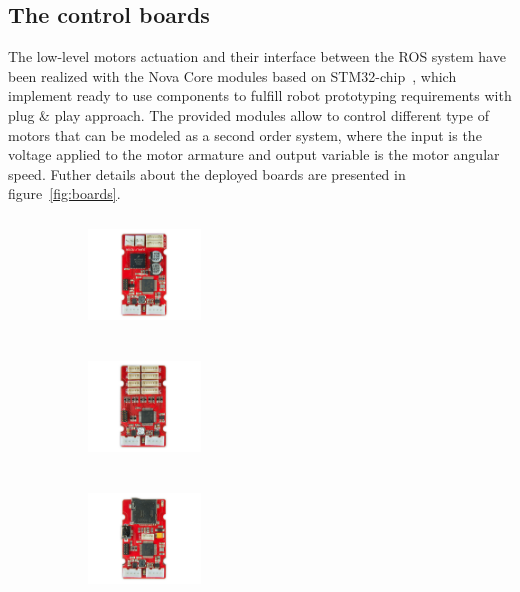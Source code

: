 \subsection{The control boards}
\label{novacore}
The low-level motors actuation and their interface between the ROS system have been realized with the Nova Core modules based on STM32-chip~\cite{noauthor_nova_nodate}, which implement ready to use components to fulfill robot prototyping requirements with plug \& play approach.  
The provided modules allow to control different type of motors that can be modeled as a second order system, where the input is the voltage applied to the motor armature and output variable is the motor angular speed. Futher details about the deployed boards are presented in figure~\ref{fig:boards}.


\begin{figure}[H]
  \centering
  \begin{subfigure}[b]{0.3\textwidth}
  \centering
      \includegraphics[width=3cm,height=3cm]{images/03-foundation/udc}
	\caption{}
  \end{subfigure}
  \begin{subfigure}[b]{0.3\textwidth}
  \centering
      \includegraphics[width=3cm,height=3cm]{images/03-foundation/io}
	\caption{}
  \end{subfigure}
  \begin{subfigure}[b]{0.3\textwidth}
  \centering
      \includegraphics[width=3cm,height=3cm]{images/03-foundation/usb}
	\caption{}
	\label{fig:usb_board}
  \end{subfigure}

\end{figure}
